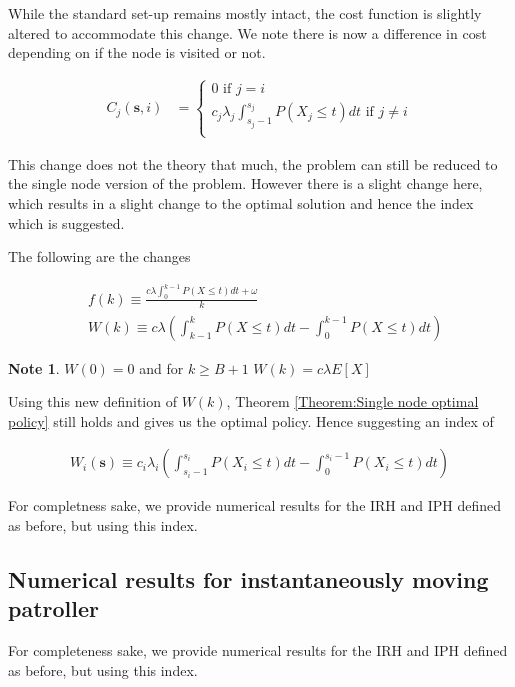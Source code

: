 \documentclass[a4paper,10pt]{article}
\theoremstyle{definition}
\theoremstyle{definition}
\theoremstyle{remark}
\theoremstyle{definition}
\newtheorem*{note}{Note}
\begin{document}
While the standard set-up remains mostly intact, the cost function is slightly altered to accommodate this change. We note there is now a difference in cost depending on if the node is visited or not.

\begin{align*}
C_{j}(\bm{s},i) &= \begin{cases}
0  \text{ if } j=i \\
c_{j} \lambda_{j} \int_{s_{j}-1}^{s_{j}} P(X_{j} \leq t) dt \text{ if } j \neq i \\
\end{cases}
\end{align*}

This change does not the theory that much, the problem can still be reduced to the single node version of the problem. However there is a slight change here, which results in a slight change to the optimal solution and hence the index which is suggested.

The following are the changes

\begin{align*}
&f(k) \equiv \frac{c \lambda \int_{0}^{k-1} P(X \leq t) dt + \omega}{k} \\
&W(k) \equiv c \lambda \left( \int_{k-1}^{k} P(X \leq t) dt - \int_{0}^{k-1} P(X \leq t) dt \right)
\end{align*}

\begin{note}
$W(0)=0$ and for $k \geq B+1$ $W(k)= c \lambda E[X]$
\end{note}

Using this new definition of $W(k)$, Theorem \ref{Theorem:Single node optimal policy} still holds and gives us the optimal policy. Hence suggesting an index of

\begin{align*}
W_{i}(\bm{s}) \equiv c_{i} \lambda_{i} \left( \int_{s_{i}-1}^{s_{i}} P(X_{i} \leq t) dt - \int_{0}^{s_{i}-1} P(X_{i} \leq t) dt \right)
\end{align*}

For completness sake, we provide numerical results for the IRH and IPH defined as before, but using this index.

\subsection{Numerical results for instantaneously moving patroller}
For completeness sake, we provide numerical results for the IRH and IPH defined as before, but using this index.
\end{document}
